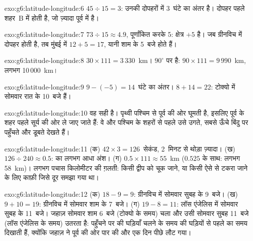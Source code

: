 \begin{solution}{exo:g6:latitude-longitude:6}
$45 \div 15 = 3$: उनकी दोपहरों में 3~घंटे का अंतर है। दोपहर पहले
शहर~B में होती है, जो ज़्यादा पूर्व में है।
\end{solution}

\begin{solution}{exo:g6:latitude-longitude:7}
$73 \div 15 \approx 4.9$, पूर्णांकित करके 5: क्षेत्र $+5$ है। जब ग्रीनविच में दोपहर
होती है, तब मुंबई में $12 + 5 = 17$, यानी शाम के 5~बजे होते हैं।
\end{solution}

\begin{solution}{exo:g6:latitude-longitude:8}
$30 \times 111 = 3\,330$~km।  $90^\circ$ पर है:
$90 \times 111 = 9\,990$~km, लगभग 10\,000~km।
\end{solution}

\begin{solution}{exo:g6:latitude-longitude:9}
$9 - (-5) = 14$~घंटे का अंतर। $8 + 14 = 22$: टोक्यो में सोमवार रात के 10~बजे
हैं।
\end{solution}

\begin{solution}{exo:g6:latitude-longitude:10}
वह सही है। पृथ्वी पश्चिम से पूर्व की ओर घूमती है, इसलिए पूर्व के शहर पहले सूर्य की ओर
ले जाए जाते हैं: वे और पश्चिम के शहरों से पहले उसे उगते, सबसे ऊँचे बिंदु पर पहुँचते
और डूबते देखते हैं।
\end{solution}

\begin{solution}{exo:g6:latitude-longitude:11}
(क) $42 \times 3 = 126$~सेकंड, 2~मिनट से थोड़ा ज़्यादा। (ख)
$126 \div 240 \approx 0.5$:  का लगभग आधा अंश। (ग)
$0.5 \times 111 \approx 55$~km ($0.525$ के साथ: लगभग 58~km)। लगभग पचास
किलोमीटर की ग़लती: किसी द्वीप को चूक जाने, या किसी ऐसे  से टकरा जाने के लिए काफ़ी
जिसे दूर समझा गया था।
\end{solution}

\begin{solution}{exo:g6:latitude-longitude:12}
(क) $18 - 9 = 9$: ग्रीनविच में सोमवार सुबह के 9~बजे। (ख) $9 + 10 = 19$:
ग्रीनविच में सोमवार शाम के 7~बजे। (ग) $19 - 8 = 11$: लॉस एंजेलिस में सोमवार सुबह के
11~बजे। जहाज़ सोमवार शाम 6~बजे (टोक्यो के समय) चला और
उसी सोमवार सुबह 11~बजे (लॉस एंजेलिस के समय) उतरता है: पहुँचने पर की घड़ियाँ
चलने के समय की घड़ियों से पहले का समय दिखाती हैं, क्योंकि जहाज़ ने पूर्व की ओर
 पार की और एक दिन पीछे लौट गया।
\end{solution}

